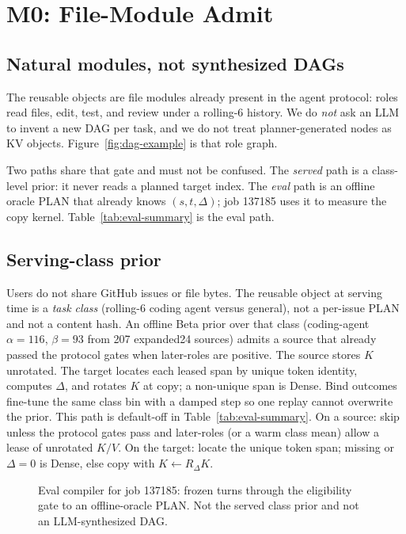 \section{M0: File-Module Admit}
\label{sec:template}

\subsection{Natural modules, not synthesized DAGs}

The reusable objects are file modules already present in the agent
protocol: roles read files, edit, test, and review under a rolling-6
history. We do \emph{not} ask an LLM to invent a new DAG per task, and
we do not treat planner-generated nodes as KV objects.
Figure~\ref{fig:dag-example} is that role graph.

Two paths share that gate and must not be confused. The
\emph{served} path is a class-level prior: it never reads a planned
target index. The \emph{eval} path is an offline oracle PLAN that
already knows $(s,t,\Delta)$; job 137185 uses it to measure the copy
kernel. Table~\ref{tab:eval-summary} is the eval path.

\subsection{Serving-class prior}

Users do not share GitHub issues or file bytes. The reusable object at
serving time is a \emph{task class} (rolling-6 coding agent versus
general), not a per-issue PLAN and not a content hash. An offline Beta
prior over that class (coding-agent $\alpha{=}116$, $\beta{=}93$ from
207 expanded24 sources) admits a source that already passed the
protocol gates when later-roles are positive. The source stores $K$
unrotated. The target locates each leased span by unique token
identity, computes $\Delta$, and rotates $K$ at copy; a non-unique span
is Dense. Bind outcomes fine-tune the same class bin with a damped
step so one replay cannot overwrite the prior.
This path is default-off in Table~\ref{tab:eval-summary}.
On a source: skip unless the protocol gates pass and later-roles (or a
warm class mean) allow a lease of unrotated $K/V$. On the target: locate
the unique token span; missing or $\Delta{=}0$ is Dense, else copy with
$K\leftarrow R_{\Delta}K$.

\begin{figure}[ht]
\centering
\resizebox{\columnwidth}{!}{}
\caption{Eval compiler for job 137185: frozen turns through the
eligibility gate to an offline-oracle PLAN. Not the served class prior
and not an LLM-synthesized DAG.}
\label{fig:template-process}
\end{figure}


